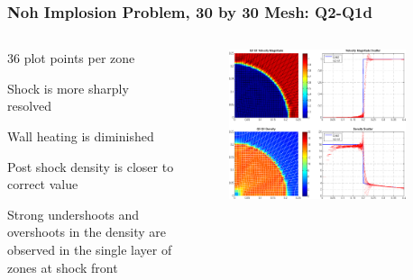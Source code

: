 \documentclass[8pt,xcolor=svgnames]{beamer}
\begin{document}
\begin{frame}
 \frametitle{Noh Implosion Problem, 30 by 30 Mesh: Q2-Q1d}
 \begin{columns}[T]
  \begin{column}{0.24\textwidth}
  \bigskip
   \begin{itemize}
   \tiny{
    \item 36 plot points per zone
    \item Shock is more sharply resolved
    \item Wall heating is diminished
    \item Post shock density is closer to correct value
    \item Strong undershoots and overshoots in the density are observed in the single layer of zones at shock front
    }
   \end{itemize}
  \end{column}
  \begin{column}{0.8\textwidth}
   \begin{figure}[h!]
    \centering
    \includegraphics[width=0.9\textwidth,keepaspectratio=true]{./Images/NewNoh_Q2Q1.png}
    \end{figure}
  \end{column}
 \end{columns}
\end{frame}
\end{document}
